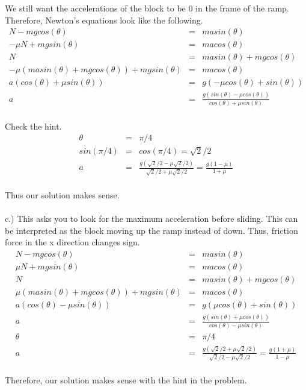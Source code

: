\documentclass[11pt]{amsart}
\begin{document}
We still want the accelerations of the block to be 0 in the frame of the ramp. Therefore, Newton's equations look like the following. \\ 
\begin{eqnarray*}
N-mgcos(\theta) &=& masin(\theta) \\
-\mu{N}+mgsin(\theta) &=& macos(\theta) \\
N &=& masin(\theta)+mgcos(\theta) \\
-\mu(masin(\theta)+mgcos(\theta)) + mgsin(\theta) &=& macos(\theta) \\
a(cos(\theta)+\mu{sin(\theta)}) &=& g(-\mu{cos(\theta)}+sin(\theta)) \\
a &=& \frac{g(sin(\theta)-\mu{cos(\theta)})}{cos(\theta)+\mu{sin(\theta)}} 
\end{eqnarray*} \\
Check the hint. \\
\begin{eqnarray*}
\theta &=& \pi/4 \\
sin(\pi/4) &=& cos(\pi/4) = \sqrt{2}/2 \\
a &=& \frac{g(\sqrt{2}/2-\mu{\sqrt{2}/2})}{\sqrt{2}/2+\mu{\sqrt{2}/2}} = \frac{g(1-\mu)}{1+\mu} 
\end{eqnarray*} \\
Thus our solution makes sense. \\ \\
c.) This asks you to look for the maximum acceleration before sliding. This can be interpreted as the block moving up the ramp instead of down. Thus, friction force in the x direction changes sign. \\
\begin{eqnarray*} 
N-mgcos(\theta) &=& masin(\theta) \\
\mu{N}+mgsin(\theta) &=& macos(\theta) \\
N &=& masin(\theta)+mgcos(\theta) \\
\mu(masin(\theta)+mgcos(\theta)) + mgsin(\theta) &=& macos(\theta) \\
a(cos(\theta)-\mu{sin(\theta)}) &=& g(\mu{cos(\theta)}+sin(\theta)) \\
a &=& \frac{g(sin(\theta)+\mu{cos(\theta)})}{cos(\theta)-\mu{sin(\theta)}} \\
\theta &=& \pi/4 \\
a &=& \frac{g(\sqrt{2}/2+\mu{\sqrt{2}/2})}{\sqrt{2}/2-\mu{\sqrt{2}/2}} = \frac{g(1+\mu)}{1-\mu}
\end{eqnarray*} \\
Therefore, our solution makes sense with the hint in the problem. \\ \\
\end{document}
